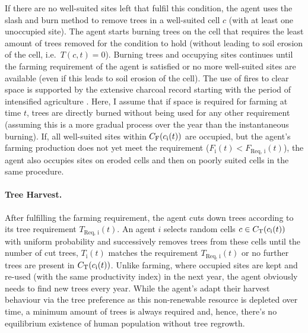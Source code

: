 If there are no well-suited sites left that fulfil this condition, the agent uses the slash and burn method to remove trees in a well-suited cell $c$ (with at least one unoccupied site).
The agent starts burning trees on the cell that requires the least amount of trees removed for the condition to hold (without leading to soil erosion of the cell, i.e.\ $T(c,t)=0$).
Burning trees and occupying sites continues until the farming requirement of the agent is satisfied or no more well-suited sites are available (even if this leads to soil erosion of the cell).
The use of fires to clear space is supported by the extensive charcoal record starting with the period of intensified agriculture \citep{Mieth2015}. 
Here, I assume that if space is required for farming at time $t$, 
trees are directly burned without being used for any other requirement (assuming this is a more gradual process over the year than the instantaneous burning).
If, all well-suited sites within $C_{\rm F}(c_{\rm i}(t))$ are occupied, but the agent's farming production does not yet meet the requirement ($F_\text{i}(t)<F_\text{Req, i}(t)$), the agent also occupies sites on eroded cells and then on poorly suited cells in the same procedure.

\paragraph{Tree Harvest.}
After fulfilling the farming requirement, the agent cuts down trees according to its tree requirement $T_\text{Req, i}(t)$.
An agent $i$ selects random cells $c\in C_{\rm T}(c_{\rm i}(t))$ with uniform probability and successively removes trees from these cells until the number of cut trees, $T_\text{i}(t)$ matches the requirement $T_\text{Req, i}(t)$ or no further trees are present in $ C_{\rm T}(c_{\rm i}(t))$. 
Unlike farming, where occupied sites are kept and re-used (with the same productivity index) in the next year, the agent obviously needs to find new trees every year.
While the agent's adapt their harvest behaviour via the tree preference as this non-renewable resource is depleted over time, a minimum amount of trees is always required and, hence, there's no equilibrium existence of human population without tree regrowth.

